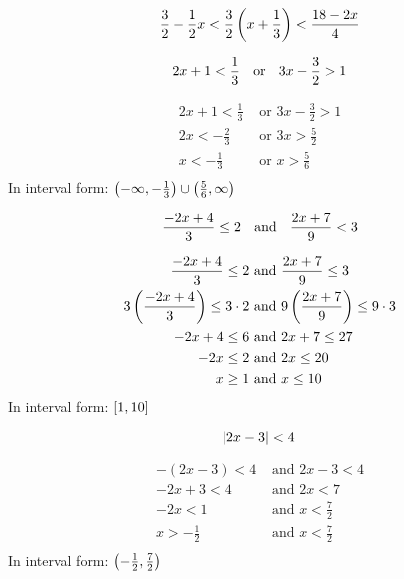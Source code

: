 \documentclass[letterpaper]{exam}
\begin{document}
\begin{questions}
    \question[10]
      \[ 
         \frac{3}{2} - \frac{1}{2} x < \frac{3}{2} \del{ x + \frac{1}{3} }  < \frac{18 - 2x}{4}
      \]

    \question[10]
      \[ 
        2x + 1 < \frac{1}{3} \text { \hspace{0.1cm} or \hspace{0.1cm} } 3x - \frac{3}{2} > 1 
      \]

      \begin{solution}
        \begin{align*}
          2x + 1 < \frac{1}{3} & \text{ or } 3x - \frac{3}{2} > 1 \\
          2x < -\frac{2}{3}    & \text{ or } 3x > \frac{5}{2} \\
          x < -\frac{1}{3}     & \text{ or } x > \frac{5}{6} \\
        \end{align*}
        In interval form: $ \intoo{ -\infty, -\frac{1}{3} } \cup \intoo{ \frac{5}{6}, \infty }$
      \end{solution}

    \question[10]
      \[ 
        \frac{-2x + 4}{3} \leq 2 \text{ \hspace{0.1cm} and \hspace{0.1cm} } \frac{2x + 7}{9} < 3 
      \]

      \begin{solution}
        \begin{align*}
          \frac{-2x + 4}{3} \leq 2                   & \text{ and } \frac{2x + 7}{9} \leq 3 \\
          3 \del{ \frac{-2x + 4}{3} } \leq 3 \cdot 2 & \text{ and } 9 \del{ \frac{2x + 7}{9} } \leq 9 \cdot 3 \\
          -2x + 4 \leq 6                             & \text{ and } 2x + 7 \leq 27 \\
          -2x \leq 2                                 & \text{ and } 2x \leq 20 \\
          x \geq 1                                   & \text{ and } x \leq 10 \\
        \end{align*}
        In interval form: $\intcc{ 1, 10 }$
      \end{solution}

    \question[10]
      \[ 
        \abs{ 2x - 3 } < 4 
      \]

      \begin{solution}
        \begin{align*}
          -(2x - 3) < 4    & \text{ and } 2x - 3 < 4 \\
          -2x + 3 < 4      & \text{ and } 2x < 7 \\
          -2x < 1          & \text{ and } x < \frac{7}{2} \\
          x > -\frac{1}{2} & \text{ and } x < \frac{7}{2} \\
        \end{align*}
        In interval form: $\intoo{ -\frac{1}{2}, \frac{7}{2} }$
      \end{solution}


\end{questions}
\end{document}
